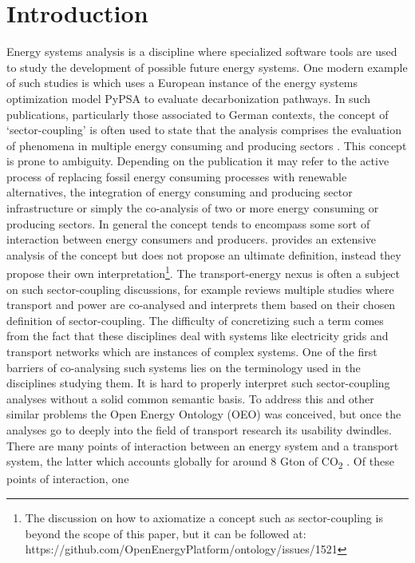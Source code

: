 ﻿\section{Introduction}
\label{introduction}
Energy systems analysis is a discipline where specialized software tools are
used to study the development of possible future energy systems. One modern
example of such studies is \cite{Victoria.2022} which uses a European instance
of the energy systems optimization model PyPSA \cite{Brown.2018} to evaluate
decarbonization pathways. In such publications, particularly those associated
to German contexts, the concept of `sector-coupling' is often used to state
that the analysis comprises the evaluation of phenomena in multiple energy
consuming and producing sectors \cite{Fridgen.2020}. This concept is prone to
ambiguity. Depending on the publication it may refer to the active process of
replacing fossil energy consuming processes with renewable alternatives, the
integration of energy consuming and producing sector infrastructure or simply
the co-analysis of two or more energy consuming or producing sectors. In
general the concept tends to encompass some sort of interaction between energy
consumers and producers. \cite{Ramsebner.2021} provides an extensive analysis
of the concept but does not propose an ultimate definition, instead they
propose their own interpretation\footnote{The discussion on how to axiomatize a
concept such as sector-coupling is beyond the scope of this paper, but it can
be followed at: https://github.com/OpenEnergyPlatform/ontology/issues/1521}.
The transport-energy nexus is often a subject on such sector-coupling
discussions, for example \cite{Robinius.2017} reviews multiple studies where
transport and power are co-analysed and interprets them based on their chosen
definition of sector-coupling. The difficulty of concretizing such a term comes
from the fact that these disciplines deal with systems like electricity grids
and transport networks which are instances of complex systems. One of the first
barriers of co-analysing  such systems lies on the terminology used in the
disciplines studying them. It is hard to properly interpret such
sector-coupling analyses without a solid common semantic basis. To address this
and other similar problems the Open Energy Ontology (OEO) \cite{Booshehri.2021}
was conceived, but once the analyses go to deeply into the field of transport
research its usability dwindles. There are many points of interaction between
an energy system and a transport system, the latter which accounts globally for
around 8 Gton of CO\textsubscript{2} \cite{IEA.2023}. Of these points of interaction, one
